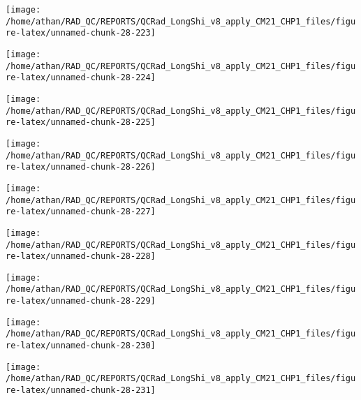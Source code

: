\documentclass[
  10pt,
  a4paper,oneside]{article}
\begin{document}
\begin{center}\texttt{[image: /home/athan/RAD\_QC/REPORTS/QCRad\_LongShi\_v8\_apply\_CM21\_CHP1\_files/figure-latex/unnamed-chunk-28-223]} \end{center}

\begin{center}\texttt{[image: /home/athan/RAD\_QC/REPORTS/QCRad\_LongShi\_v8\_apply\_CM21\_CHP1\_files/figure-latex/unnamed-chunk-28-224]} \end{center}

\begin{center}\texttt{[image: /home/athan/RAD\_QC/REPORTS/QCRad\_LongShi\_v8\_apply\_CM21\_CHP1\_files/figure-latex/unnamed-chunk-28-225]} \end{center}

\begin{center}\texttt{[image: /home/athan/RAD\_QC/REPORTS/QCRad\_LongShi\_v8\_apply\_CM21\_CHP1\_files/figure-latex/unnamed-chunk-28-226]} \end{center}

\begin{center}\texttt{[image: /home/athan/RAD\_QC/REPORTS/QCRad\_LongShi\_v8\_apply\_CM21\_CHP1\_files/figure-latex/unnamed-chunk-28-227]} \end{center}

\begin{center}\texttt{[image: /home/athan/RAD\_QC/REPORTS/QCRad\_LongShi\_v8\_apply\_CM21\_CHP1\_files/figure-latex/unnamed-chunk-28-228]} \end{center}

\begin{center}\texttt{[image: /home/athan/RAD\_QC/REPORTS/QCRad\_LongShi\_v8\_apply\_CM21\_CHP1\_files/figure-latex/unnamed-chunk-28-229]} \end{center}

\begin{center}\texttt{[image: /home/athan/RAD\_QC/REPORTS/QCRad\_LongShi\_v8\_apply\_CM21\_CHP1\_files/figure-latex/unnamed-chunk-28-230]} \end{center}

\begin{center}\texttt{[image: /home/athan/RAD\_QC/REPORTS/QCRad\_LongShi\_v8\_apply\_CM21\_CHP1\_files/figure-latex/unnamed-chunk-28-231]} \end{center}
\end{document}
